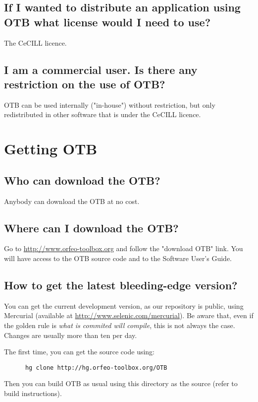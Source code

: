 \subsection{If I wanted to distribute an application using OTB what license would I need to use?}
    The CeCILL licence.

\subsection{I am a commercial user. Is there any restriction on the
  use of OTB?}
OTB can be used internally ("in-house") without restriction, but only
redistributed in other software that is under the CeCILL licence.

\section{Getting OTB}

\subsection{Who can download the OTB?}
Anybody can download the OTB at no cost.

\subsection{Where can I download the OTB?}
Go to \url{http://www.orfeo-toolbox.org}
 and follow the "download OTB" link. You will have access to the OTB
source code and to the Software User's Guide.

\subsection{How to get the latest bleeding-edge version?}\label{sec:FAQMercurial}

You can get the current development version, as our repository is public, using Mercurial (available at \url{http://www.selenic.com/mercurial}). Be aware that, even if the golden rule is {\em what is commited will compile}, this is not always the case. Changes are usually more than ten per day.

The first time, you can get the source code using:
\begin{verbatim}
      hg clone http://hg.orfeo-toolbox.org/OTB
\end{verbatim}

Then you can build OTB as usual using this directory as the source (refer to build instructions).

